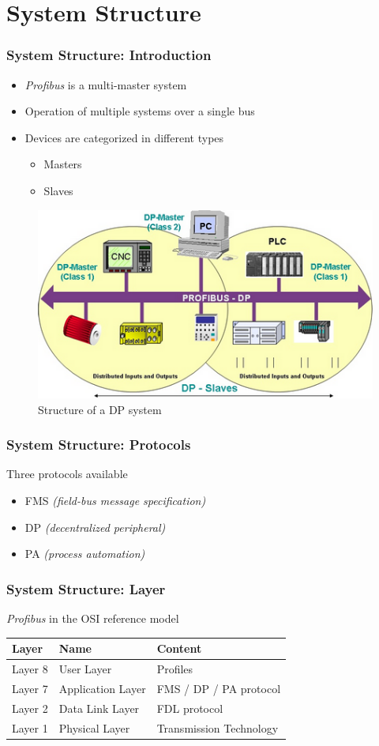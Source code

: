 \documentclass{beamer}
\begin{document}
\section{System Structure}
\begin{frame}
  \frametitle{System Structure: Introduction}
  \begin{itemize}
    \item \textit{Profibus} is a multi-master system
    \item Operation of multiple systems over a single bus
    \item Devices are categorized in different types
      \begin{itemize}
        \item Masters
        \item Slaves
      \end{itemize}
  \end{itemize}
      \center
      \begin{figure}
        \includegraphics[width=.50\textwidth]{img/dp_system.png}
        \caption{Structure of a DP system~\cite{profibusmanual}}
      \end{figure}
\end{frame}

\begin{frame}
  \frametitle{System Structure: Protocols}
  Three protocols available
  \begin{itemize}
    \item FMS \textit{(field-bus message specification)}
    \item DP \textit{(decentralized peripheral)}
    \item PA \textit{(process automation)}
  \end{itemize}
\end{frame}

\begin{frame}
  \frametitle{System Structure: Layer}
  \textit{Profibus} in the OSI reference model~\cite{profibusmanual}
  \center
  \footnotesize
  \begin{tabular}[h]{l|l|l}
    \textbf{Layer}  & \textbf{Name}     & \textbf{Content} \\
    \hline
    Layer 8         & User Layer        & Profiles \\
    Layer 7         & Application Layer & FMS / DP / PA protocol \\
    Layer 2         & Data Link Layer   & FDL protocol \\
    Layer 1         & Physical Layer    & Transmission Technology
  \end{tabular} \\
\end{frame}
\end{document}
